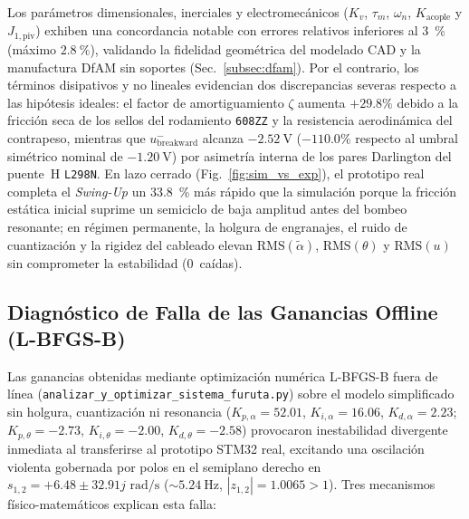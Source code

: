 Los parámetros dimensionales, inerciales y electromecánicos ($K_v$, $\tau_m$, $\omega_n$, $K_{\text{acople}}$ y $J_{1,\text{piv}}$) exhiben una concordancia notable con errores relativos inferiores al \qty{3}{\percent} (máximo $\qty{2.8}{\percent}$), validando la fidelidad geométrica del modelado CAD y la manufactura DfAM sin soportes (Sec.~\ref{subsec:dfam}). Por el contrario, los términos disipativos y no lineales evidencian dos discrepancias severas respecto a las hipótesis ideales: el factor de amortiguamiento $\zeta$ aumenta $+29.8\%$ debido a la fricción seca de los sellos del rodamiento \texttt{608ZZ} y la resistencia aerodinámica del contrapeso, mientras que $u_{\text{breakward}}^{-}$ alcanza $-\qty{2.52}{\volt}$ ($-110.0\%$ respecto al umbral simétrico nominal de $-\qty{1.20}{\volt}$) por asimetría interna de los pares Darlington del puente~H \texttt{L298N}. En lazo cerrado (Fig.~\ref{fig:sim_vs_exp}), el prototipo real completa el \textit{Swing-Up} un \qty{33.8}{\percent} más rápido que la simulación porque la fricción estática inicial suprime un semiciclo de baja amplitud antes del bombeo resonante; en régimen permanente, la holgura de engranajes, el ruido de cuantización y la rigidez del cableado elevan $\mathrm{RMS}(\tilde{\alpha})$, $\mathrm{RMS}(\theta)$ y $\mathrm{RMS}(u)$ sin comprometer la estabilidad ($0$~caídas).

\subsection{Diagnóstico de Falla de las Ganancias Offline (L-BFGS-B)}\label{subsec:diagnostico_lbfgsb}

Las ganancias obtenidas mediante optimización numérica L-BFGS-B fuera de línea (\texttt{analizar\_y\_optimizar\_}\allowbreak\texttt{sistema\_furuta.py}) sobre el modelo simplificado sin holgura, cuantización ni resonancia ($K_{p,\alpha}=52.01$, $K_{i,\alpha}=16.06$, $K_{d,\alpha}=2.23$; $K_{p,\theta}=-2.73$, $K_{i,\theta}=-2.00$, $K_{d,\theta}=-2.58$) provocaron inestabilidad divergente inmediata al transferirse al prototipo STM32 real, excitando una oscilación violenta gobernada por polos en el semiplano derecho en $s_{1,2} = +6.48 \pm 32.91j\text{ rad/s}$ ($\sim\qty{5.24}{\hertz}$, $|z_{1,2}|=1.0065>1$). Tres mecanismos físico-matemáticos explican esta falla:

